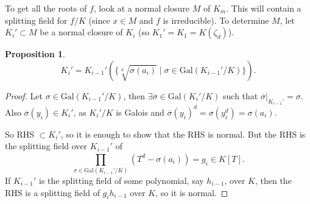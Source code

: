 \documentclass{article}
\theoremstyle{definition}
\newtheorem{prop}[theorem]{Proposition}
\begin{document}
To get all the roots of $f$, look at a normal closure $M$ of $K_m$. This will contain a splitting field for $f/K$ (since $x \in M$ and $f$ is irreducible). To determine $M$, let $K_i' \subset M$ be a normal closure of $K_i$ (so $K_1' = K_1 = K(\zeta_d)$).
\begin{prop}
$$K_i' = K_{i-1}'(\{ \sqrt[d]{\sigma(a_i)} \mid \sigma \in \text{Gal}(K_{i-1}'/K) \}).$$
\end{prop}
\begin{proof}
    Let $\sigma \in \text{Gal}(K_{i-1}'/K)$, then $\exists \overline{\sigma} \in \text{Gal}(K_i'/K)$ such that $\overline{\sigma}|_{K_{i-1}'} = \sigma$. Also $\overline{\sigma}(y_i) \in K_i'$, as $K_i'/K$ is Galois and $\overline{\sigma}(y_i)^d = \sigma(y_i^d) = \sigma(a_i)$.
    \vspace{1mm}
    
    So RHS $\subset K_i'$, so it is enough to show that the RHS is normal. But the RHS is the splitting field over $K_{i-1}'$ of \[
    \prod_{\sigma \in \text{Gal}(K_{i-1}'/K)}^{}(T^d-\sigma(a_i)) = g_i \in K[T].
    \]
    If $K_{i-1}'$ is the splitting field of some polynomial, say $h_{i-1}$, over $K$, then the RHS is a splitting field of $g_i h_{i-1}$ over $K$, so it is normal.
\end{proof}
\end{document}
